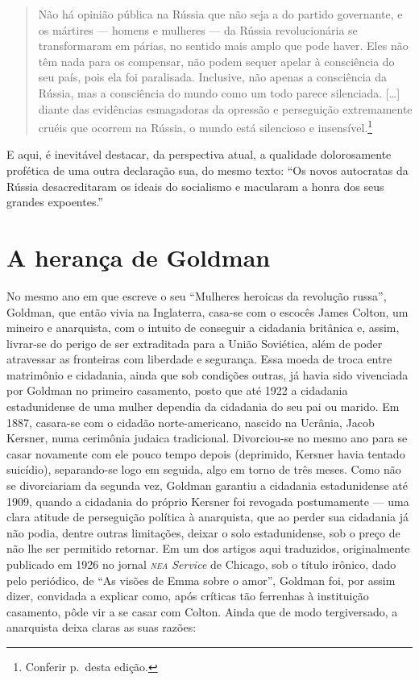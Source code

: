 \begin{quote}
Não há opinião pública na Rússia que não seja a do partido governante, e
os mártires --- homens e mulheres --- da Rússia revolucionária se
transformaram em párias, no sentido mais amplo que pode haver. Eles não
têm nada para os compensar, não podem sequer apelar à consciência do seu
país, pois ela foi paralisada. Inclusive, não apenas a consciência da
Rússia, mas a consciência do mundo como um todo parece silenciada.
{[}\ldots{]} diante das evidências esmagadoras da opressão e perseguição
extremamente cruéis que ocorrem na Rússia, o mundo está silencioso e
insensível.\footnote{Conferir p.\,\pageref{ref2} desta edição.}
\end{quote}

E aqui, é inevitável destacar, da perspectiva atual, a
qualidade dolorosamente profética de uma outra declaração sua, do mesmo texto: ``Os novos autocratas da Rússia desacreditaram os
ideais do socialismo e macularam a honra dos seus grandes expoentes.''

\section{A herança de Goldman}

No mesmo ano em que escreve o seu ``Mulheres heroicas da revolução
russa'', Goldman, que então vivia na Inglaterra, casa-se com o escocês
James Colton, um mineiro e anarquista, com o intuito de conseguir a
cidadania britânica e, assim, livrar-se do perigo de ser
extraditada para a União Soviética, além de poder atravessar as
fronteiras com liberdade e segurança. Essa moeda de troca entre
matrimônio e cidadania, ainda que sob condições outras, já havia sido
vivenciada por Goldman no primeiro casamento, posto que até 1922 a
cidadania estadunidense de uma mulher dependia da cidadania do seu pai
ou marido. Em 1887, casara-se com o cidadão norte-americano, nascido na
Ucrânia, Jacob Kersner, numa cerimônia judaica tradicional.
Divorciou-se no mesmo ano para se casar novamente com ele pouco tempo
depois (deprimido, Kersner havia tentado suicídio), separando-se logo em
seguida, algo em torno de três meses. Como não se divorciariam da
segunda vez, Goldman garantiu a cidadania estadunidense até 1909, quando a cidadania
do próprio Kersner foi revogada postumamente --- uma clara
atitude de perseguição política à anarquista, que ao perder
sua cidadania já não podia, dentre outras limitações,
deixar o solo estadunidense, sob o preço de não lhe ser permitido
retornar. Em um dos artigos aqui traduzidos, originalmente publicado em 1926 no
jornal \textit{\textsc{nea} Service} de Chicago, sob o título irônico, dado
pelo periódico, de ``As visões de Emma sobre o amor'', Goldman foi, por
assim dizer, convidada a explicar como, após críticas tão
ferrenhas à instituição casamento, pôde vir a se casar com Colton. Ainda
que de modo tergiversado, a anarquista deixa claras as suas razões:

